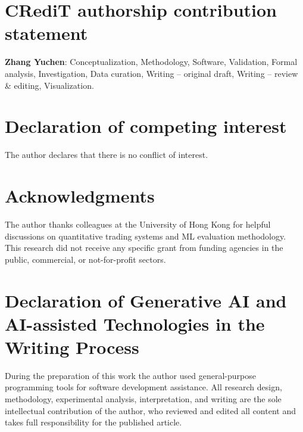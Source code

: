 \documentclass[preprint,review,12pt]{elsarticle}
\begin{document}
\section*{CRediT authorship contribution statement}

\textbf{Zhang Yuchen}: Conceptualization, Methodology, Software, Validation, Formal analysis, Investigation, Data curation, Writing -- original draft, Writing -- review \& editing, Visualization.

\section*{Declaration of competing interest}

The author declares that there is no conflict of interest.

\section*{Acknowledgments}
The author thanks colleagues at the University of Hong Kong for helpful discussions on quantitative trading systems and ML evaluation methodology.
This research did not receive any specific grant from funding agencies in the public, commercial, or not-for-profit sectors.

\section*{Declaration of Generative AI and AI-assisted Technologies in the Writing Process}
During the preparation of this work the author used general-purpose programming tools for software development assistance. All research design, methodology, experimental analysis, interpretation, and writing are the sole intellectual contribution of the author, who reviewed and edited all content and takes full responsibility for the published article.



\end{document}
